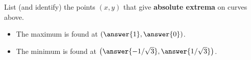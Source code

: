 \documentclass{ximera}
\begin{document}
\begin{problem}
  List (and identify) the points $(x,y)$ that give \textbf{absolute extrema} on
  curves above.
  \begin{prompt}
    \begin{itemize}
    \item The maximum is found at $\left(\answer{1},\answer{0}\right)$.
    \item The minimum is found at $\left(\answer{-1/\sqrt{3}},\answer{1/\sqrt{3}}\right)$.
    \end{itemize}
  \end{prompt}
  \vfill
\end{problem}

\end{document}
